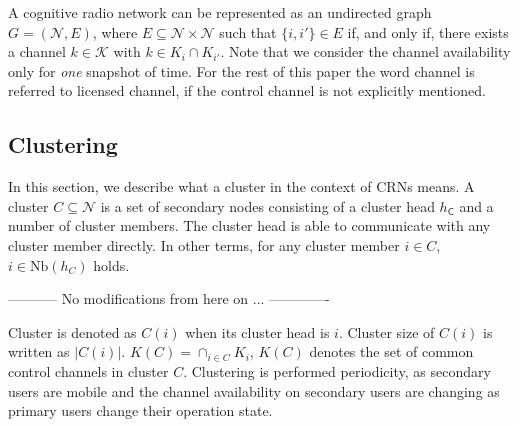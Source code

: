 \documentclass[10pt,journal,compsoc]{IEEEtran}
\theoremstyle{mytheoremstyle}
\theoremstyle{mytheoremstyle}
\theoremstyle{mytheoremstyle}
\newcommand{\ie}{i.e., }
\begin{document}
A cognitive radio network can be represented as an undirected graph $G = (\mathcal{N}, E)$, where $E \subseteq \mathcal{N} \times \mathcal{N}$ such that $\{i, i'\} \in E$  if, and only if, there exists a channel $k \in \mathcal{K}$ with $k \in K_{i} \cap K_{i'}$. Note that we consider the channel availability only for \textit{one} snapshot of time. For the rest of this paper the word channel is referred to licensed channel, if the control channel is not explicitly mentioned.



\subsection{Clustering}
\label{def_cluster}
In this section, we describe what a cluster in the context of CRNs means.
A cluster $C \subseteq \mathcal{N}$ is a set of secondary nodes consisting of a cluster head $h_{\textsf{C}}$ and a number of cluster members.
The cluster head is able to communicate with any cluster member directly.
In other terms, for any cluster member $i \in C$, $i \in \text{Nb} (h_C) $ holds.



----------- No modifications from here on ... -------------

Cluster is denoted as $C(i)$ when its cluster head is $i$.
Cluster size of $C(i)$ is written as $|C(i)|$.
$ K(C) = \cap_{i\in C} K_i$, $K(C)$ denotes the set of common control channels in cluster $C$.
Clustering is performed periodicity, as secondary users are mobile and the channel availability on secondary users are changing as primary users change their operation state.%
\end{document}
